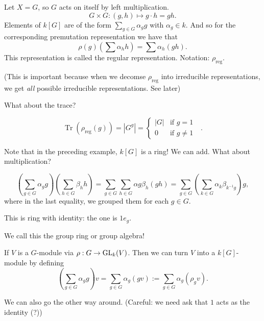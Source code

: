 \begin{eg}
    Let $X = G$, so $G$ acts on itself by left multiplication.
    \[
        G \times G : (g, h) \mapsto  g\cdot h = gh
    .\] 
    Elements of $k[G]$ are of the form  $\sum_{g \in G} \alpha_g g$ with $\alpha_g \in k $.
    And so for the corresponding premutation representation we have that
    \[
        \rho(g)(\sum \alpha_h h) = \sum \alpha_h(gh)
    .\] 
    This representation is called the regular representation. 
    Notation: $\rho_\text{reg}$.

    (This is important because when we decomse $\rho_\text{reg} $ into irreducible representations, we get \emph{all} possible irreducible representations. See later)

    What about the trace?

    \[
        \operatorname{Tr}(\rho_\text{reg} (g)) = |G^{g}| = \begin{cases}
            |G| &\text{if $g = 1$ }\\
            0 &\text{if $g \neq 1$}
        \end{cases}
    .\] 
\end{eg}
\begin{remark}
    Note that in the preceding example, $k[G]$ is a ring!
    We can add. What about multiplication?

    \[
        (\sum_{g \in G} \alpha_g g)(\sum_{h \in G} \beta_h h)
        = \sum_{g \in G} \sum_{h \in G} \alpha g \beta_h (gh)
        = \sum_{g \in G} \left(\sum_{k \in G} \alpha_{k} \beta_{k^{-1} g} \right)g 
    ,\] 
    where in the last equality, we grouped them for each $g \in G.$

    This is ring with identity: the one is $1 e_g$.

    We call this the group ring or group algebra!
\end{remark}

\begin{remark}
    If $V$ is a $G$-module via $\rho: G \to \operatorname{GL}_{k}(V)$.
    Then we can turn $V$ into a $k[G]$-module by defining
    \[
        \left(\sum_{g \in G} \alpha_g g\right) v = \sum_{g \in G} \alpha_g ( gv )
        := \sum_{g \in G} \alpha_g (\rho_g v)
    .\] 

    We can also go the other way around.  (Careful: we need ask that $1$  acts as the identity (?))
\end{remark}


